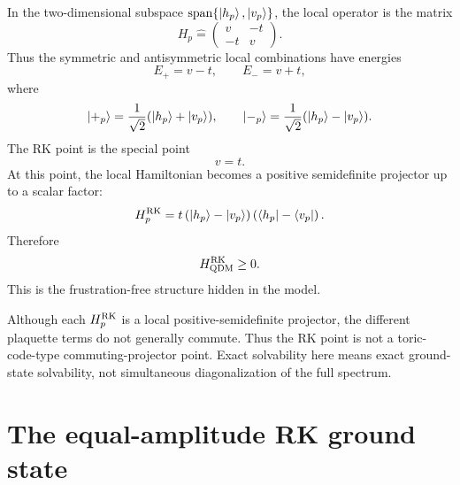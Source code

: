 In the two-dimensional subspace
\(\operatorname{span}\{\left|h_p\right\rangle,\left|v_p\right\rangle\}\), the local operator is the matrix
\begin{equation}
\label{eq:qdm-local-matrix}
    H_p
    \widehat{=}
    \begin{pmatrix}
        v & -t \\
        -t & v
    \end{pmatrix}.
\end{equation}
Thus the symmetric and antisymmetric local combinations have energies
\begin{equation}
\label{eq:qdm-local-eigenvalues}
    E_{+}=v-t,
    \qquad
    E_{-}=v+t,
\end{equation}
where
\begin{equation}
\label{eq:qdm-local-symmetric-antisymmetric}
    \left|+_p\right\rangle=\frac{1}{\sqrt{2}}(\left|h_p\right\rangle+\left|v_p\right\rangle),
    \qquad
    \left|-_p\right\rangle=\frac{1}{\sqrt{2}}(\left|h_p\right\rangle-\left|v_p\right\rangle).
\end{equation}
The RK point is the special point
\begin{equation}
\label{eq:rk-point-condition}
    v=t .
\end{equation}
At this point, the local Hamiltonian becomes a positive semidefinite projector
up to a scalar factor:
\begin{equation}
\label{eq:qdm-local-rk-projector}
    H_p^{\rm RK}
    =
    t
    \left(
        \left|h_p\right\rangle-\left|v_p\right\rangle
    \right)
    \left(
        \left\langle h_p\right|-\left\langle v_p\right|
    \right).
\end{equation}
Therefore
\begin{equation}
\label{eq:qdm-rk-positive-semidefinite}
    H_{\rm QDM}^{\rm RK}\geq0 .
\end{equation}
This is the frustration-free structure hidden in the model.

\begin{remark}
Although each \(H_p^{\rm RK}\) is a local positive-semidefinite projector, the
different plaquette terms do not generally commute.  Thus the RK point is not a
toric-code-type commuting-projector point.  Exact solvability here means exact
ground-state solvability, not simultaneous diagonalization of the full spectrum.
\end{remark}

\section{The equal-amplitude RK ground state}
\label{sec:equal-amplitude-rk-ground-state}

